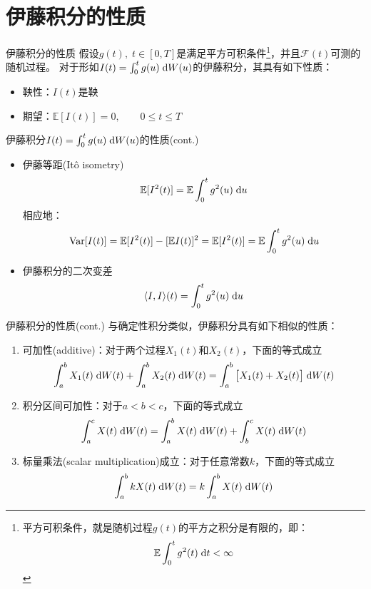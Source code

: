 \documentclass[t]{beamer}
\newcommand{\dif}{{\;\rm d}}
\newcommand{\E}{\mathbb{E}}
\newcommand{\Var}{{\rm Var}}
\begin{document}
\section{伊藤积分的性质}
\begin{frame}{伊藤积分的性质}
假设$g(t), \; t\in[0,T]$是满足平方可积条件\footnote{平方可积条件，就是随机过程$g(t)$的平方之积分是有限的，即：$$\E\int^t_0 g^2(t)\dif t<\infty$$}，并且$\mathcal{F}(t)$可测的随机过程。 对于形如$I(t)=\int^t_0 g(u)\dif W(u)$的伊藤积分，其具有如下性质：
\begin{itemize}
	\item 鞅性：$I(t)$是鞅
	\item 期望：$\E[I(t)]=0,\qquad 0\le t\le T$
\end{itemize}
\end{frame}

\begin{frame}{伊藤积分$I(t)=\int^t_0 g(u)\dif W(u)$的性质(cont.)}
\begin{itemize}
	\item 伊藤等距(It\^{o} isometry)
	\begin{equation*}
	\E [I^2(t)]=\E\int^t_0 g^2(u)\dif u
	\end{equation*}
相应地：
\begin{equation*}
\Var[I(t)]=\E[I^2(t)]-[\E I(t)]^2=\E[I^2(t)]=\E\int^t_0 g^2(u)\dif u
\end{equation*}
\item 伊藤积分的二次变差
	\begin{equation*}
	\langle I,I\rangle (t)= \int^t_0 g^2(u)\dif u
	\end{equation*}

\end{itemize}
\end{frame}

\begin{frame}{伊藤积分的性质(cont.)}
\normalsize
与确定性积分类似，伊藤积分具有如下相似的性质：
\begin{enumerate}
\item 可加性(additive)：对于两个过程$X_1(t)$和$X_2(t)$，下面的等式成立
\[\int^b_a X_1(t)\dif W(t)+\int^b_a X_2(t)\dif W(t)=\int^b_a \big[X_1(t)+X_2(t)\big]\dif W(t) \]
\item 积分区间可加性：对于$a<b<c$，下面的等式成立
\[\int^c_a X(t)\dif W(t)=\int^b_a X(t)\dif W(t)+\int^c_b X(t)\dif W(t) \]
\item 标量乘法(scalar multiplication)成立：对于任意常数$k$，下面的等式成立
\[\int^b_a kX(t)\dif W(t)=k\int^b_a X(t)\dif W(t) \]
\end{enumerate}
\end{frame}
\end{document}
